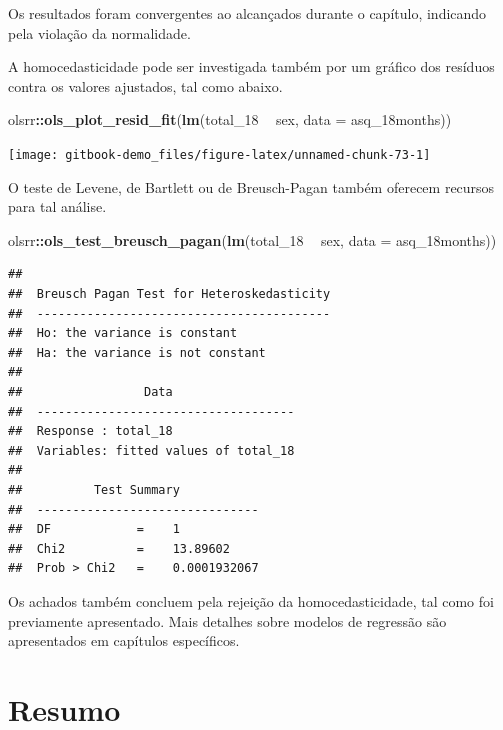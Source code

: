 \documentclass[
]{book}
\newenvironment{Shaded}{\begin{snugshade}}{\end{snugshade}}
\newcommand{\DataTypeTok}[1]{\textcolor[rgb]{0.13,0.29,0.53}{#1}}
\newcommand{\DecValTok}[1]{\textcolor[rgb]{0.00,0.00,0.81}{#1}}
\newcommand{\KeywordTok}[1]{\textcolor[rgb]{0.13,0.29,0.53}{\textbf{#1}}}
\newcommand{\NormalTok}[1]{#1}
\newcommand{\OperatorTok}[1]{\textcolor[rgb]{0.81,0.36,0.00}{\textbf{#1}}}
\newcommand{\StringTok}[1]{\textcolor[rgb]{0.31,0.60,0.02}{#1}}
\begin{document}
Os resultados foram convergentes ao alcançados durante o capítulo, indicando pela violação da normalidade.

A homocedasticidade pode ser investigada também por um gráfico dos resíduos contra os valores ajustados, tal como abaixo.

\begin{Shaded}
\begin{Highlighting}[]
\NormalTok{olsrr}\OperatorTok{::}\KeywordTok{ols_plot_resid_fit}\NormalTok{(}\KeywordTok{lm}\NormalTok{(total_}\DecValTok{18} \OperatorTok{~}\StringTok{ }\NormalTok{sex, }\DataTypeTok{data =}\NormalTok{ asq_18months))}
\end{Highlighting}
\end{Shaded}

\begin{center}\texttt{[image: gitbook-demo\_files/figure-latex/unnamed-chunk-73-1]} \end{center}

O teste de Levene, de Bartlett ou de Breusch-Pagan também oferecem recursos para tal análise.

\begin{Shaded}
\begin{Highlighting}[]
\NormalTok{olsrr}\OperatorTok{::}\KeywordTok{ols_test_breusch_pagan}\NormalTok{(}\KeywordTok{lm}\NormalTok{(total_}\DecValTok{18} \OperatorTok{~}\StringTok{ }\NormalTok{sex, }\DataTypeTok{data =}\NormalTok{ asq_18months))}
\end{Highlighting}
\end{Shaded}

\begin{verbatim}
## 
##  Breusch Pagan Test for Heteroskedasticity
##  -----------------------------------------
##  Ho: the variance is constant            
##  Ha: the variance is not constant        
## 
##                 Data                 
##  ------------------------------------
##  Response : total_18 
##  Variables: fitted values of total_18 
## 
##          Test Summary           
##  -------------------------------
##  DF            =    1 
##  Chi2          =    13.89602 
##  Prob > Chi2   =    0.0001932067
\end{verbatim}

Os achados também concluem pela rejeição da homocedasticidade, tal como foi previamente apresentado. Mais detalhes sobre modelos de regressão são apresentados em capítulos específicos.

\hypertarget{resumo-8}{%
\section{Resumo}\label{resumo-8}}
\end{document}
